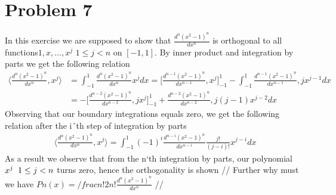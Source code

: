 \documentclass[a4paper,norsk]{article}
\begin{document}
\section*{Problem 7}
In this exercise we are supposed to show that $\frac{d^n(x^2 -1 )^n}{dx^n}$ is orthogonal to all functions$1, x, ...,x^{j}$ $1 \leq j < n$
on $[-1, 1]$. By inner product and integration by parts we get the following relation
\begin{align}
\langle \frac{d^n(x^2 -1 )^n}{dx^n}, x^{j}\rangle &= \int_{-1}^{1} \frac{d^n(x^2 -1 )^n}{dx^n} x^{j} dx = 
\Big[\frac{d^{n-1}(x^2 -1 )^n}{dx^{n-1}}, x^{j} \Big]_{-1}^{1} - \int_{-1}^{1} \frac{d^{n-1}(x^2 -1 )^n}{dx^{n-1}}, jx^{j-1} dx \\
&= - \Big[\frac{d^{n-2}(x^2 -1 )^n}{dx^{n-2}}, jx^{j} \Big]_{-1}^{1} + \frac{d^{n-2}(x^2 -1 )^n}{dx^{n-2}}, j(j-1)x^{j-2} dx
\end{align}
Observing that our boundary integrations equals zero, we get the following relation after the i´th step of integration by parts
\begin{align}
\langle \frac{d^n(x^2 -1 )^n}{dx^n}, x^{j}\rangle = \int_{-1}^1(-1)^i\frac{d^{n-i}(x^2 -1 )^n}{dx^{n-i}} \frac{j!}{(j-i)!} x^{j-i} dx
\end{align}
As a result we observe that from the n`th integration by parts, our polynomial $x^{j} \hspace{2mm} 1 \leq j < n$ turns zero, hence the orthogonality is shown //
Further why must we have  $Pn(x) = /frac{n!}{2n!} \frac{d^n(x^2-1)^n}{dx^n}$ //
\end{document}
